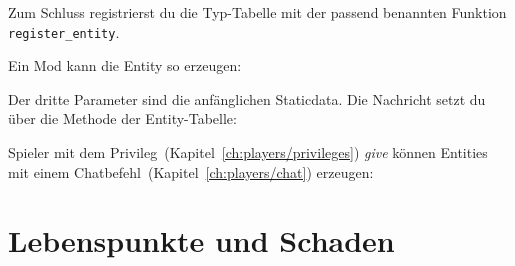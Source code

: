 Zum Schluss registrierst du die Typ-Tabelle mit der passend benannten
Funktion \texttt{register\_\allowbreak{}entity}.

\begin{Shaded}
\begin{Highlighting}[]
\OperatorTok{(}\OperatorTok{,} \OperatorTok{)}
\end{Highlighting}
\end{Shaded}

Ein Mod kann die Entity so erzeugen:

\begin{Shaded}
\begin{Highlighting}[]
  \OperatorTok{=} \OperatorTok{\{}  \OperatorTok{=} \OperatorTok{,}  \OperatorTok{=} \OperatorTok{,}  \OperatorTok{=}  \OperatorTok{\}}
  \OperatorTok{=} \OperatorTok{(}\OperatorTok{,} \OperatorTok{,} \OperatorTok{)}
\end{Highlighting}
\end{Shaded}

Der dritte Parameter sind die anfänglichen Staticdata. Die Nachricht
setzt du über die Methode der Entity-Tabelle:

\begin{Shaded}
\begin{Highlighting}[]
\OperatorTok{:}\OperatorTok{():}\OperatorTok{(}\OperatorTok{)}
\end{Highlighting}
\end{Shaded}

Spieler mit dem
Privileg~(Kapitel~\ref{ch:players/privileges})
\emph{give} können Entities mit einem
Chatbefehl~(Kapitel~\ref{ch:players/chat})
erzeugen:

\begin{Shaded}
\begin{Highlighting}[]
\end{Highlighting}
\end{Shaded}

\section{Lebenspunkte und Schaden}\label{lebenspunkte-und-schaden}

